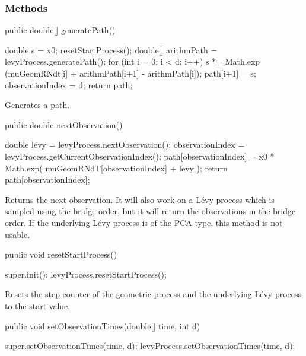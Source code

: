 \subsubsection* {Methods}
\begin{code}

   public double[] generatePath() \begin{hide} {
        double s = x0;
        resetStartProcess();
        double[] arithmPath = levyProcess.generatePath();
        for (int i = 0; i < d; i++)
        {
            s *= Math.exp (muGeomRNdt[i] + arithmPath[i+1] - arithmPath[i]);
            path[i+1] = s;
        }
        observationIndex = d;
        return path;
    }\end{hide}
\end{code}
\begin{tabb} Generates a path.
\end{tabb}
\begin{code}

   public double nextObservation() \begin{hide} {
       double levy = levyProcess.nextObservation();
       observationIndex = levyProcess.getCurrentObservationIndex();
       path[observationIndex] = x0 * 
             Math.exp( muGeomRNdT[observationIndex] + levy );
       return path[observationIndex];
    }\end{hide}
\end{code}
\begin{tabb} 
Returns the next observation. 
It will also work on a L\'evy process which is sampled using
the bridge order, but it will return the observations in 
the bridge order.
If the underlying L\'evy process is of the PCA type, this
method is not usable.
\end{tabb}
\begin{code}

   public void resetStartProcess() \begin{hide} {
        super.init();
        levyProcess.resetStartProcess();
    }\end{hide}
\end{code}
\begin{tabb} Resets the step counter of the geometric process and 
the underlying L\'evy process to the start value.
\end{tabb}
\begin{code}

   public void setObservationTimes(double[] time, int d) \begin{hide} {
        super.setObservationTimes(time, d);
        levyProcess.setObservationTimes(time, d);
    }\end{hide}
\end{code}
